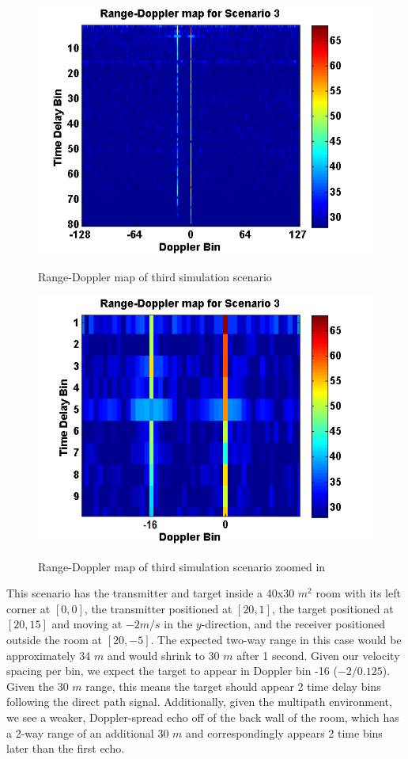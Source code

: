 \documentclass[article,11pt,onecolumn,final]{IEEEtran}
\begin{document}
\begin{figure}[H]
	\caption{Range-Doppler map of third simulation scenario}
	\centering
	\includegraphics[width=400pt]{figures/rdm3.png}
	\label{fig:rdm3}
\end{figure}

\begin{figure}[H]
	\caption{Range-Doppler map of third simulation scenario zoomed in}
	\centering
	\includegraphics[width=400pt]{figures/rdm3zoom.png}
	\label{fig:rdm3zoom}
\end{figure}

This scenario has the transmitter and target inside a 40x30 $m^2$ room with its left corner at $[0, 0]$, the transmitter positioned at $[20, 1]$, the target positioned at $[20, 15]$ and moving at $-2 m/s$ in the $y$-direction, and the receiver positioned outside the room at $[20, -5]$. The expected two-way range in this case would be approximately 34 $m$ and would shrink to 30 $m$ after 1 second. Given our velocity spacing per bin, we expect the target to appear in Doppler bin -16 ($-2 / 0.125$). Given the 30 $m$ range, this means the target should appear 2 time delay bins following the direct path signal. Additionally, given the multipath environment, we see a weaker, Doppler-spread echo off of the back wall of the room, which has a 2-way range of an additional 30 $m$ and correspondingly appears 2 time bins later than the first echo.
\end{document}
